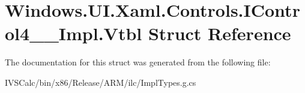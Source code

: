 \hypertarget{struct_windows_1_1_u_i_1_1_xaml_1_1_controls_1_1_i_control4_____impl_1_1_vtbl}{}\section{Windows.\+U\+I.\+Xaml.\+Controls.\+I\+Control4\+\_\+\+\_\+\+Impl.\+Vtbl Struct Reference}
\label{struct_windows_1_1_u_i_1_1_xaml_1_1_controls_1_1_i_control4_____impl_1_1_vtbl}


The documentation for this struct was generated from the following file\+:\begin{DoxyCompactItemize}
\item 
I\+V\+S\+Calc/bin/x86/\+Release/\+A\+R\+M/ilc/Impl\+Types.\+g.\+cs\end{DoxyCompactItemize}
